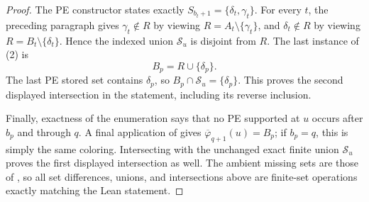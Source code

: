 \begin{proof}
The PE constructor states exactly
\(S_{b_t+1}=\{\delta_t,\gamma_t\}\).  For every \(t\), the preceding
paragraph gives \(\gamma_t\notin R\) by viewing
\(R=A_t\setminus\{\gamma_t\}\), and
\(\delta_t\notin R\) by viewing
\(R=B_t\setminus\{\delta_t\}\).  Hence the indexed union
\(\mathcal S_u\) is disjoint from \(R\).  The last instance of (2) is
\[
 B_p=R\cup\{\delta_p\}.
\]
The last PE stored set contains \(\delta_p\), so
\(B_p\cap\mathcal S_u=\{\delta_p\}\).  This proves the second displayed
intersection in the statement, including its reverse inclusion.

Finally, exactness of the enumeration says that no PE supported at
\(u\) occurs after \(b_p\) and through \(q\).  A final application of
 gives
\(\overline\varphi_{q+1}(u)=B_p\); if \(b_p=q\), this is simply the same
coloring.  Intersecting with the unchanged exact finite union
\(\mathcal S_u\) proves the first displayed intersection as well.
The ambient missing sets are those of , so all
set differences, unions, and intersections above are finite-set
operations exactly matching the Lean statement.
\end{proof}
